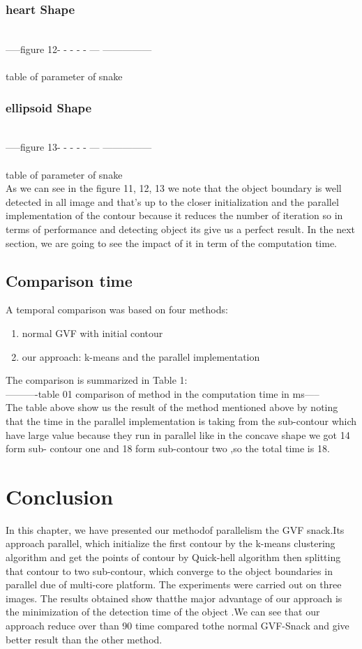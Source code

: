 \subsubsection{heart Shape}
\\-----figure 12- - - - - ---  ---------------\\
\\table of parameter of snake \\
\subsubsection{ellipsoid Shape}
\\-----figure 13- - - - - ---  ---------------\\
\\table of parameter of snake \\
As we can see in the figure 11, 12, 13 we note that the object boundary is well
detected in all image and that's up to the closer initialization and the parallel
implementation of the contour because it reduces the number of iteration so in
terms of performance and detecting object its give us a perfect result. In the next
section, we are going to see the impact of it in term of the computation time.
\subsection{Comparison time}\label{subsec:comparison-time}
A temporal comparison was based on four methods:
\begin{enumerate}
    \item normal GVF with initial contour
    \item our approach: k-means and the parallel implementation
\end{enumerate}
The comparison is summarized in Table 1:\\
----------table 01 comparison of method in the computation time in ms-----\\
The table above show us the result of the method mentioned above by noting that
the time in the parallel implementation is taking from the sub-contour which have
large value because they run in parallel like in the concave shape we got 14 form sub-
contour one and 18 form sub-contour two ,so the total time is 18.
\section{Conclusion}\label{sec:conclusion}
In this chapter, we have presented our methodof parallelism the GVF snack.Its
approach parallel, which initialize the first contour by the k-means clustering
algorithm and get the points of contour by Quick-hell algorithm then splitting that
contour to two sub-contour, which converge to the object boundaries in parallel due
of multi-core platform.
The experiments were carried out on three images. The results obtained show
thatthe major advantage of our approach is the minimization of the detection time
of the object .We can see that our approach reduce over than 90%
time compared tothe normal GVF-Snack and give better result than the other
method.